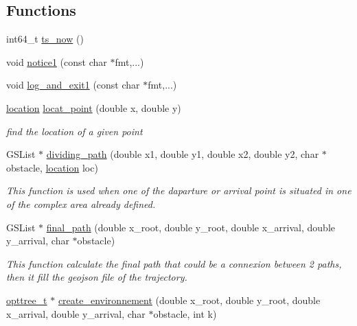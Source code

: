 \subsection*{\-Functions}
\begin{DoxyCompactItemize}
\item 
int64\-\_\-t \hyperlink{a00015_a7a93270b029dd7f09ac421ff7a473cd9_a7a93270b029dd7f09ac421ff7a473cd9}{ts\-\_\-now} ()
\item 
void \hyperlink{a00015_abb72a9e5586947ffa14de7aea6c8d7b4_abb72a9e5586947ffa14de7aea6c8d7b4}{notice1} (const char $\ast$fmt,...)
\item 
void \hyperlink{a00015_ab369473e6f056b28d426c97004c47828_ab369473e6f056b28d426c97004c47828}{log\-\_\-and\-\_\-exit1} (const char $\ast$fmt,...)
\item 
\hyperlink{a00016_a5f269c22e6d9d32b0b0ad7e6166854df_a5f269c22e6d9d32b0b0ad7e6166854df}{location} \hyperlink{a00015_a8fccd24d5b565d686f8ffd2820bf372a_a8fccd24d5b565d686f8ffd2820bf372a}{locat\-\_\-point} (double x, double y)
\begin{DoxyCompactList}\small\item\em find the location of a given point \end{DoxyCompactList}\item 
\-G\-S\-List $\ast$ \hyperlink{a00015_a25f1e769fb021e10c7a6923f56ab4f46_a25f1e769fb021e10c7a6923f56ab4f46}{dividing\-\_\-path} (double x1, double y1, double x2, double y2, char $\ast$obstacle, \hyperlink{a00016_a5f269c22e6d9d32b0b0ad7e6166854df_a5f269c22e6d9d32b0b0ad7e6166854df}{location} loc)
\begin{DoxyCompactList}\small\item\em \-This function is used when one of the daparture or arrival point is situated in one of the complex area already defined. \end{DoxyCompactList}\item 
\-G\-S\-List $\ast$ \hyperlink{a00015_ae5f4c19ccdc3caa6ce122c0887481a16_ae5f4c19ccdc3caa6ce122c0887481a16}{final\-\_\-path} (double x\-\_\-root, double y\-\_\-root, double x\-\_\-arrival, double y\-\_\-arrival, char $\ast$obstacle)
\begin{DoxyCompactList}\small\item\em \-This function calculate the final path that could be a connexion between 2 paths, then it fill the geojson file of the trajectory. \end{DoxyCompactList}\item 
\hyperlink{a00020_a07b75293fafb6f31b7e9f723848ad105_a07b75293fafb6f31b7e9f723848ad105}{opttree\-\_\-t} $\ast$ \hyperlink{a00015_a55d37159a13f40fdb4d2bda4b8a4c599_a55d37159a13f40fdb4d2bda4b8a4c599}{create\-\_\-environnement} (double x\-\_\-root, double y\-\_\-root, double x\-\_\-arrival, double y\-\_\-arrival, char $\ast$obstacle, int k)

\end{DoxyCompactItemize}
